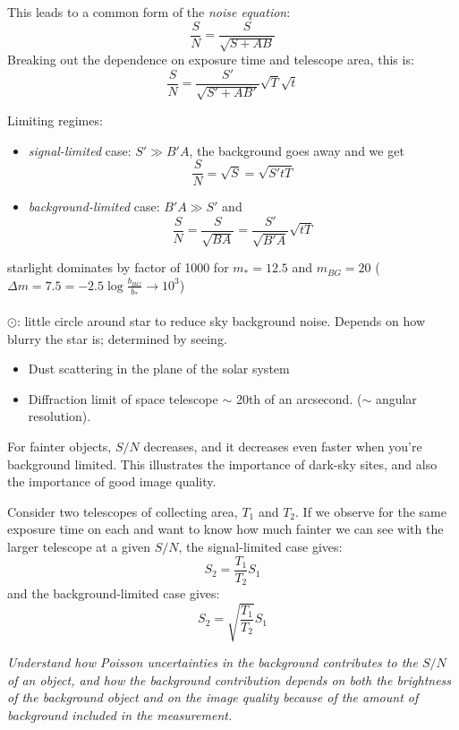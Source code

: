 \documentclass[12pt]{article}
\newcommand{\mynotes}[1]{\textcolor{myBlue}{#1}}
\newcommand{\test}[1]{%
    \begin{center}
        {\parbox{0.9\textwidth}{\textit{\small#1}}}
    \end{center}}
\begin{document}
This leads to a common form of the \textit{noise equation}:
\[
    \frac{S}{N} = \frac{S}{\sqrt{S+AB}}
    \]
Breaking out the dependence on exposure time and telescope area, this is:
\[
    \frac{S}{N} = \frac{S'}{\sqrt{S'+AB'}} \sqrt{T}\sqrt{t}
    \]

Limiting regimes:
\begin{itemize}
    \item \textit{signal-limited} case: $S'\gg B'A$,
        the background goes away and we get
        \[
             \frac{S}{N} = \sqrt{S} = \sqrt{S'tT}
             \]
    \item \textit{background-limited} case: $B'A \gg S'$ and
        \[
            \frac{S}{N} = \frac{S}{\sqrt{BA}} = \frac{S'}{\sqrt{B'A}}\sqrt{tT}
            \]
\end{itemize}

\mynotes{starlight dominates by factor of 1000 for
$m_{*} = 12.5$ and $m_{BG} = 20$ ($\Delta{m} = 7.5
= -2.5\log\frac{b_{BG}}{b_*}
\rightarrow 10^{3}$)\\\\
\large$\odot$: \normalsize little circle around star to reduce sky
background noise. Depends on how blurry the star is; determined by
seeing.
\begin{itemize}
    \item Dust scattering in the plane of the solar system
    \item Diffraction limit of space telescope $\sim$ 20th of an
    arcsecond. ($\sim$ angular resolution).
\end{itemize}
}

For fainter objects, $S/N$ decreases, and it decreases even faster when you're
background limited. This illustrates the importance of dark-sky sites, and also
the importance of good image quality.

Consider two telescopes of collecting area, $T_{1}$ and $T_{2}$.
If we observe for the same exposure time on each and want to know how
much fainter we can see with the larger telescope at a given $S/N$,
the signal-limited case gives:
\[
    S_{2} = \frac{T_{1}}{T_{2}}S_{1}
    \]
and the background-limited case gives:
\[
    S_{2} = \sqrt{\frac{T_{1}}{T_{2}}}S_{1}
    \]

\test{Understand how Poisson uncertainties in the background contributes to the
$S/N$ of an object, and how the background contribution depends on both the
brightness of the background object and on the image quality because of the
amount of background included in the measurement.}
\end{document}
